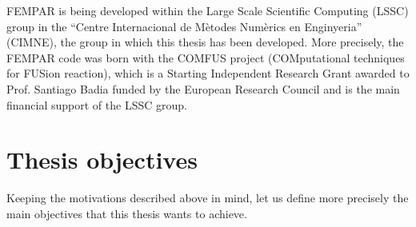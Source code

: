 FEMPAR is being developed within the Large Scale Scientific Computing (LSSC) group in the ``Centre Internacional de Mètodes Numèrics en Enginyeria'' (CIMNE), the group in which this thesis has been developed. More precisely, the FEMPAR code was born with the COMFUS project (COMputational techniques for FUSion reaction), which is a Starting Independent Research Grant awarded to Prof. Santiago Badia funded by the European Research Council and is the main financial support of the LSSC group.
 

\section{Thesis objectives}
\label{sec-C1_objectives}

Keeping the motivations described above in mind, let us define more precisely the main objectives that this thesis wants to achieve.

